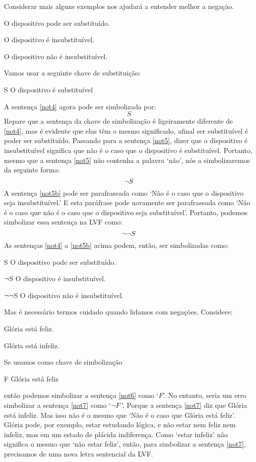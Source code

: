 \noindent Considerar mais alguns exemplos nos ajudará a entender melhor a negação.
	\begin{earg}
		\item[\ex{not4}] O dispositivo pode ser substituído.
		\item[\ex{not5}] O dispositivo é insubstituível.
		\item[\ex{not5b}] O dispositivo não é insubstituível.
	\end{earg}
Vamos usar a seguinte chave de substituição:
	\begin{ekey}
		\item[S] O dispositivo é substituível
	\end{ekey}
A sentença \ref{not4} agora pode ser simbolizada por:
$$S$$
Repare que a sentença da chave de simbolização é ligeiramente diferente de \ref{not4}, mas é evidente que elas têm o mesmo significado, afinal ser substituível é poder ser substituído.
Passando para a sentença \ref{not5}, dizer que o dispositivo é insubstituível significa que não é o caso que o dispositivo é substituível.
Portanto, mesmo que a sentença \ref{not5} não contenha a palavra `não', nós a simbolizaremos da seguinte forma: $$\neg S$$
A sentença \ref{not5b} pode ser parafraseada como `Não é o caso que o dispositivo seja insubstituível.'
E esta paráfrase pode novamente ser parafraseada como `Não é o caso que não é o caso que o dispositivo seja substituível'.
Portanto, podemos simbolizar essa sentença na LVF como:
$$\neg\neg S$$
As sentenças \ref{not4} a \ref{not5b} acima podem, então, ser simbolizadas como:
	\begin{ekey}
		\item[S] O dispositivo pode ser substituído.
		\item[$\neg$S] O dispositivo é insubstituível.
		\item[$\neg\neg$S] O dispositivo não é insubstituível.
	\end{ekey}

Mas é necessário termos cuidado quando lidamos com negações. Considere:
	\begin{earg}
		\item[\ex{not6}] Glória está feliz.
		\item[\ex{not7}] Glória está infeliz.
	\end{earg}
Se usamos como chave de simbolização
	\begin{ekey}
		\item[F] Glória está feliz
	\end{ekey}
então podemos simbolizar a sentença \ref{not6} como `$F$'.
No entanto, seria um erro simbolizar a sentença \ref{not7} como `$\neg{F}$'. 
Porque a sentença \ref{not7} diz que Glória está infeliz.
Mas isso não é o mesmo que `Não é o caso que Glória está feliz'.
Glória pode, por exemplo, estar estudando lógica, e não estar nem feliz nem infeliz, mas em um estado  de plácida indiferença.
Como `estar infeliz' não significa o mesmo que `não estar feliz', então, para simbolizar a sentença \ref{not7}, precisamos de uma nova letra sentencial da LVF.


